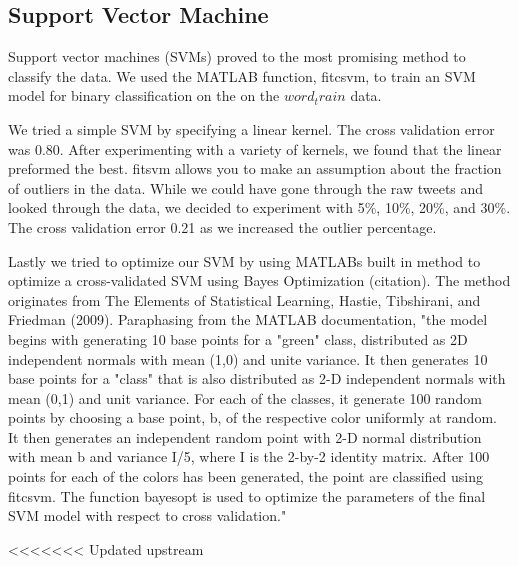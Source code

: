 \documentclass[]{article}
\begin{document}
\subsection{Support Vector Machine}

Support vector machines (SVMs) proved to the most promising method to classify the data. We used the MATLAB function, fitcsvm, to train an SVM model for binary classification on the on the $word_train$ data.

We tried a simple SVM by specifying a linear kernel. The cross validation error was 0.80. After experimenting with a variety of kernels, we found that the linear preformed the best. fitsvm allows you to make an assumption about the fraction of outliers in the data. While we could have gone through the raw tweets and looked through the data, we decided to experiment with 5\%, 10\%, 20\%, and 30\%. The cross validation error 0.21 as we increased the outlier percentage. 

Lastly we tried to optimize our SVM by using MATLABs built in method to optimize a cross-validated SVM using Bayes Optimization (citation). The method originates from The Elements of Statistical Learning, Hastie, Tibshirani, and Friedman (2009). Paraphasing from the MATLAB documentation,  "the model begins with generating 10 base points for a "green" class, distributed as 2D independent normals with mean (1,0) and unite variance. It then generates 10 base points for a "class" that is also distributed as 2-D independent normals with mean (0,1) and unit variance. For each of the classes, it generate 100 random points by choosing a base point, b, of the respective color uniformly at random. It then generates an independent random point with 2-D normal distribution with mean b and variance I/5, where I is the 2-by-2 identity matrix. After 100 points for each of the colors has been generated, the point are classified using fitcsvm. The function bayesopt is used to optimize the parameters of the final SVM model with respect to cross validation."





<<<<<<< Updated upstream
\end{document}
